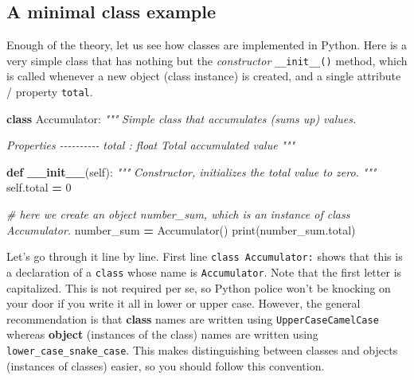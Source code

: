 \documentclass[
]{book}
\newenvironment{Shaded}{\begin{snugshade}}{\end{snugshade}}
\newcommand{\BuiltInTok}[1]{#1}
\newcommand{\CommentTok}[1]{\textcolor[rgb]{0.56,0.35,0.01}{\textit{#1}}}
\newcommand{\DecValTok}[1]{\textcolor[rgb]{0.00,0.00,0.81}{#1}}
\newcommand{\FunctionTok}[1]{\textcolor[rgb]{0.13,0.29,0.53}{\textbf{#1}}}
\newcommand{\KeywordTok}[1]{\textcolor[rgb]{0.13,0.29,0.53}{\textbf{#1}}}
\newcommand{\NormalTok}[1]{#1}
\newcommand{\OperatorTok}[1]{\textcolor[rgb]{0.81,0.36,0.00}{\textbf{#1}}}
\newcommand{\VariableTok}[1]{\textcolor[rgb]{0.00,0.00,0.00}{#1}}
\begin{document}
\hypertarget{a-minimal-class-example}{%
\subsection{A minimal class example}\label{a-minimal-class-example}}

Enough of the theory, let us see how classes are implemented in Python. Here is a very simple class that has nothing but the \emph{constructor} \texttt{\_\_init\_\_()} method, which is called whenever a new object (class instance) is created, and a single attribute / property \texttt{total}.

\begin{Shaded}
\begin{Highlighting}[]
\KeywordTok{class}\NormalTok{ Accumulator:}
    \CommentTok{"""}
\CommentTok{    Simple class that accumulates (sums up) values.}

\CommentTok{    Properties}
\CommentTok{    {-}{-}{-}{-}{-}{-}{-}{-}{-}{-}}
\CommentTok{    total : float}
\CommentTok{        Total accumulated value}
\CommentTok{    """}

    \KeywordTok{def} \FunctionTok{\_\_init\_\_}\NormalTok{(}\VariableTok{self}\NormalTok{):}
        \CommentTok{"""}
\CommentTok{        Constructor, initializes the total value to zero.}
\CommentTok{        """}
        \VariableTok{self}\NormalTok{.total }\OperatorTok{=} \DecValTok{0}
        
\CommentTok{\# here we create an object number\_sum, which is an instance of class Accumulator.}
\NormalTok{number\_sum }\OperatorTok{=}\NormalTok{ Accumulator()}
\BuiltInTok{print}\NormalTok{(number\_sum.total)}
\end{Highlighting}
\end{Shaded}

Let's go through it line by line. First line \texttt{class\ Accumulator:} shows that this is a declaration of a \texttt{class} whose name is \texttt{Accumulator}. Note that the first letter is capitalized. This is not required per se, so Python police won't be knocking on your door if you write it all in lower or upper case. However, the general recommendation is that \textbf{class} names are written using \texttt{UpperCaseCamelCase} whereas \textbf{object} (instances of the class) names are written using \texttt{lower\_case\_snake\_case}. This makes distinguishing between classes and objects (instances of classes) easier, so you should follow this convention.
\end{document}
